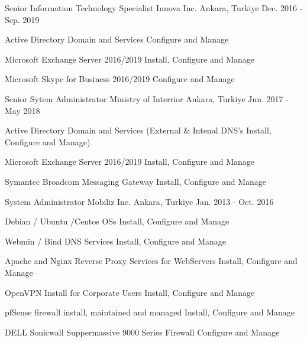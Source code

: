 \begin{cventries}
  \cventry
    {Senior Information Technology Specialist} %
    {Innova Inc.} %
    {Ankara, Turkiye} %
    {Dec. 2016 - Sep. 2019} %
    {
      \begin{cvitems} %
        \item {Active Directory Domain and Services Configure and Manage}
        \item {Microsoft Exchange Server 2016/2019 Install, Configure and Manage}
        \item {Microsoft Skype for Business 2016/2019 Configure and Manage}
      \end{cvitems}
    }
  \cventry
    {Senior Sytem Administrator} %
    {Ministry of Interrior} %
    {Ankara, Turkiye} %
    {Jun. 2017 - May 2018} %
    {
      \begin{cvitems} %
        \item {Active Directory Domain and Services (External \& Intenal DNS's Install, Configure and Manage)}
        \item {Microsoft Exchange Server 2016/2019 Install, Configure and Manage}
        \item {Symantec Broadcom Messaging Gateway Install, Configure and Manage}
      \end{cvitems}
    }
  \cventry
    {System Administrator} %
    {Mobiliz Inc.} %
    {Ankara, Turkiye} %
    {Jan. 2013 - Oct. 2016} %
    {
      \begin{cvitems} %
        \item {Debian / Ubuntu /Centos OSs Install, Configure and Manage}
        \item {Webmin / Bind DNS Services Install, Configure and Manage}
        \item {Apache and Nginx Reverse Proxy Services for WebServers Install, Configure and Manage}
        \item {OpenVPN Install for Corporate Users Install, Configure and Manage}
        \item {pfSense firewall install, maintained and managed Install, Configure and Manage}
        \item {DELL Sonicwall Suppermassive 9000 Series Firewall Configure and Manage}

\end{cvitems}}
\end{cventries}
